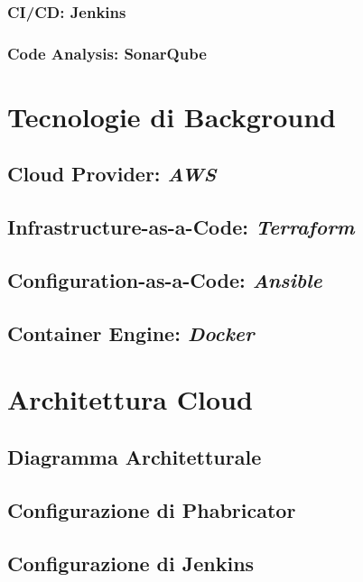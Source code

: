 \documentclass[a4paper,12pt]{report}
\begin{document}
	\subsection{CI/CD: Jenkins}
	
	\subsection{Code Analysis: SonarQube}
	
	\chapter{Tecnologie di Background}
	
	\section{Cloud Provider: \emph{AWS}}
	
	\section{Infrastructure-as-a-Code: \emph{Terraform}}
	
	\section{Configuration-as-a-Code: \emph{Ansible}}
	
	\section{Container Engine: \emph{Docker}}
	
	\chapter{Architettura Cloud}
	
	\section{Diagramma Architetturale}
	
	\section{Configurazione di Phabricator}
	
	\section{Configurazione di Jenkins}
	
\end{document}
